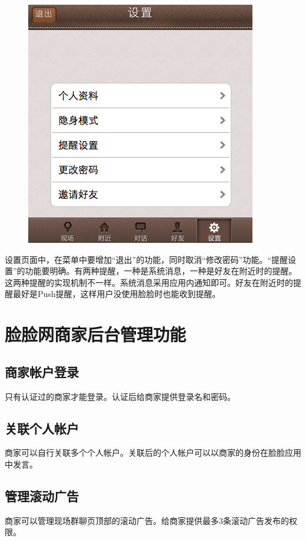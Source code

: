 \documentclass[cs4size]{ctexartutf8}
\begin{document}
\begin{figure}[H]
\centering
\includegraphics[scale=0.5]{./10.png}
\end{figure}

设置页面中，在菜单中要增加“退出”的功能，同时取消“修改密码”功能。“提醒设置”的功能要明确。有两种提醒，一种是系统消息，一种是好友在附近时的提醒。这两种提醒的实现机制不一样。系统消息采用应用内通知即可。好友在附近时的提醒最好是Push提醒，这样用户没使用脸脸时也能收到提醒。



\section{脸脸网商家后台管理功能}
\subsection{商家帐户登录}
只有认证过的商家才能登录。认证后给商家提供登录名和密码。

\subsection{关联个人帐户}
商家可以自行关联多个个人帐户。关联后的个人帐户可以以商家的身份在脸脸应用中发言。

\subsection{管理滚动广告}
商家可以管理现场群聊页顶部的滚动广告。给商家提供最多3条滚动广告发布的权限。
\end{document}

